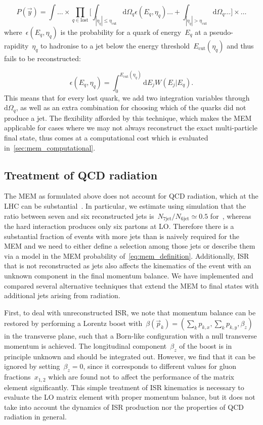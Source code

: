 \begin{equation}
P(\vec{y}) = \int \dots \times \prod_{q\in\mathrm{lost}} \biggl[ \int_{|\eta_q| \leq \eta_{\mathrm{cut}}} \mathrm{d}\Omega_q \epsilon(E_q, \eta_q) \dots + \int_{|\eta_q| > \eta_{\mathrm{cut}}} \mathrm{d}\Omega_q \dots \biggr] \times \dots
\end{equation}
where~$\epsilon(E_q, \eta_q)$ is the probability for a quark of energy~$E_q$ at a pseudo-rapidity~$\eta_q$ to hadronise to a jet below the energy threshold~$E_{\mathrm{cut}}(\eta_q)$ and thus fails to be reconstructed:

\begin{equation}
\epsilon(E_q, \eta_q) = \int_0^{E_{\mathrm{cut}}(\eta_q)} \mathrm{d}E_j W(E_j | E_q).
\end{equation}
This means that for every lost quark, we add two integration variables through~$\mathrm{d}\Omega_q$, as well as an extra combination for choosing which of the quarks did not produce a jet. The flexibility afforded by this technique, which makes the MEM applicable for cases where we may not always reconstruct the exact multi-particle final state, thus comes at a computational cost which is evaluated in~\cref{sec:mem_computational}.

\subsection{Treatment of QCD radiation}
\label{sec:mem_radiation}

The MEM as formulated above does not account for QCD radiation, which at the LHC can be substantial~\cite{Alwall:2010cq}. In particular, we estimate using simulation that the ratio between seven and six reconstructed jets is~$N_{7\mathrm{jet}}/N_{6\mathrm{jet}} \simeq 0.5$ for~\ttHbb, whereas the hard interaction produces only six partons at LO. Therefore there is a substantial fraction of events with more jets than is naively required for the MEM and we need to either define a selection among those jets or describe them via a model in the MEM probability of~\cref{eq:mem_definition}. Additionally, ISR that is not reconstructed as jets also affects the kinematics of the event with an unknown component in the final momentum balance. We have implemented and compared several alternative techniques that extend the MEM to final states with additional jets arising from radiation.

First, to deal with unreconstructed ISR, we note that momentum balance can be restored by performing a Lorentz boost with~$\beta(\vec{p}_k) = (\sum_k p_{k,x}, \sum_k p_{k,y}, \beta_z)$ in the transverse plane, such that a Born-like configuration with a null transverse momentum is achieved. The longitudinal component~$\beta_z$ of the boost is in principle unknown and should be integrated out. However, we find that it can be ignored by setting~$\beta_z = 0$, since it corresponds to different values for gluon fractions~$x_{1,2}$ which are found not to affect the performance of the matrix element significantly. This simple treatment of ISR kinematics is necessary to evaluate the LO matrix element with proper momentum balance, but it does not take into account the dynamics of ISR production nor the properties of QCD radiation in general.

